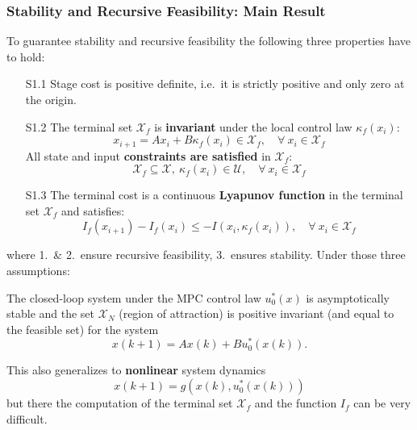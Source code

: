 \subsubsection{Stability and Recursive Feasibility: Main Result}\label{stab_rec_feasibility}
To guarantee stability and recursive feasibility the following three properties have to hold:
\begin{enumerate}[leftmargin=24pt]
    \item[S1.1] Stage cost is positive definite, i.e.\ it is strictly positive and only zero at the origin.
    \item[S1.2] The terminal set $\mathcal{X}_f$ is \textbf{invariant} under the local control law $\kappa_f(x_i)$:
          \begin{equation*}
              x_{i+1} = Ax_i +B\kappa_f(x_i) \in \mathcal{X}_f, \quad \forall\: x_i \in \mathcal{X}_f
          \end{equation*}
          All state and input \textbf{constraints are satisfied} in $\mathcal{X}_f$:
          \begin{equation*}
              \mathcal{X}_f \subseteq \mathcal{X}, \: \kappa_f(x_i) \in \mathcal{U}, \quad \forall\: x_i \in \mathcal{X}_f
          \end{equation*}
    \item[S1.3] The terminal cost is a continuous \textbf{Lyapunov function} in the terminal set $\mathcal{X}_f$ and satisfies:
          \begin{equation*}
              I_f(x_{i+1})-I_f(x_i) \leq -I(x_i,\kappa_f(x_i)), \quad \forall\: x_i \in \mathcal{X}_f
          \end{equation*}
\end{enumerate}
where 1.\ \& 2.\ ensure recursive feasibility, 3.\ ensures stability.
\newpar{}
Under those three assumptions:

The closed-loop system under the MPC control law $u_0^*(x)$ is asymptotically stable and the set $\mathcal{X}_N$ (region of attraction) is positive invariant (and equal to the feasible set) for the system
\begin{equation*}
    x(k+1) = Ax(k) + Bu_0^*(x(k)).
\end{equation*}

This also generalizes to \textbf{nonlinear} system dynamics
\begin{equation*}
    x(k+1) = g(x(k),u_0^*(x(k)))
\end{equation*}
but there the computation of the terminal set $\mathcal{X}_f$ and the function $I_f$ can be very difficult.

